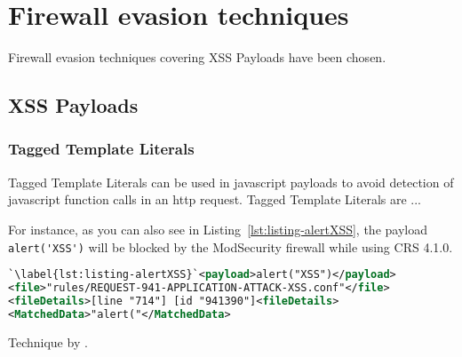 \section{Firewall evasion techniques}
\label{sec:Firewall evasion techniques}

Firewall evasion techniques covering XSS Payloads have been chosen.



\subsection{XSS Payloads}

\subsubsection{Tagged Template Literals}
Tagged Template Literals can be used in javascript payloads to avoid detection of javascript function calls in an http request. Tagged Template Literals are ...
\cite{exploringes6/templatelit}

For instance, as you can also see in Listing~\ref{lst:listing-alertXSS}, the payload \verb|alert('XSS')| will be blocked by the ModSecurity firewall while using CRS 4.1.0.

\begin{lstlisting}[style=ruleStyle, language=XML, caption=alert("XSS") blocking example]
`\label{lst:listing-alertXSS}`<payload>alert("XSS")</payload>
<file>"rules/REQUEST-941-APPLICATION-ATTACK-XSS.conf"</file>
<fileDetails>[line "714"] [id "941390"]<fileDetails>
<MatchedData>"alert("</MatchedData>
\end{lstlisting}

Technique by \cite{onecons/wafbypass}.

\label{sec:XSS Payloads}
